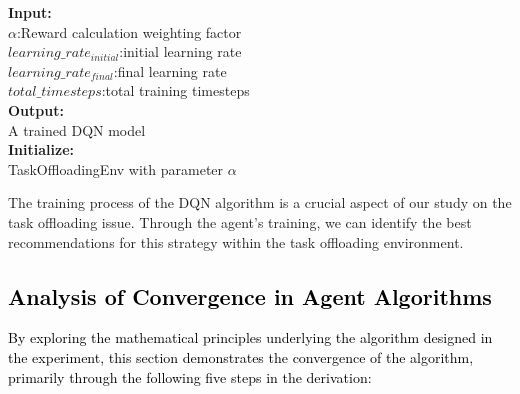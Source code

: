 \documentclass[preprint,12pt]{elsarticle}
\begin{document}
\begin{algorithm}[H]
    \caption{DQN Training for Task Offloading}
    \textbf{Input:}\\
        $\alpha$:Reward calculation weighting factor\\
        $learning\_rate_{initial}$:initial learning rate\\
        $learning\_rate_{final}$:final learning rate\\
        $total\_timesteps$:total training timesteps\\
    \textbf{Output:}
    \\A trained DQN model\\
    \textbf{Initialize:}
    \\TaskOffloadingEnv with parameter $\alpha$\\
\end{algorithm}

The training process of the DQN algorithm is a crucial aspect of our study on the task offloading issue. Through the agent's training, we can identify the best recommendations for this strategy within the task offloading environment.

\subsection{\textcolor{black}{Analysis of Convergence in Agent Algorithms}}

\textcolor{black}{By exploring the mathematical principles underlying the algorithm designed in the experiment, this section demonstrates the convergence of the algorithm, primarily through the following five steps in the derivation:}
\end{document}
